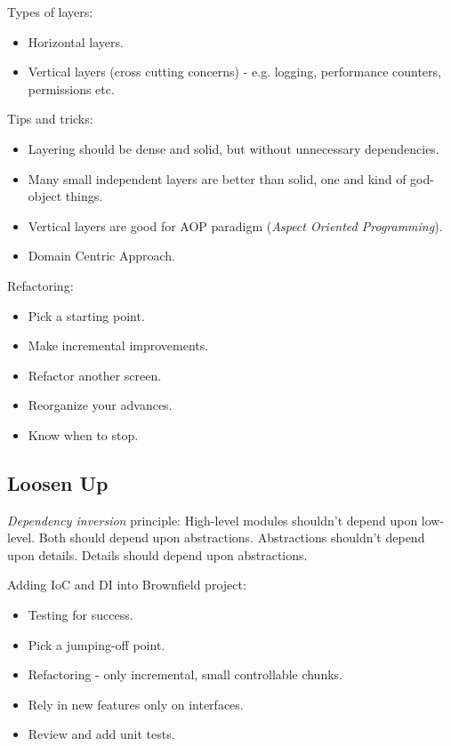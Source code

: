 \documentclass[11pt,a4paper]{article}
\begin{document}
Types of layers:
\begin{itemize}
	\item Horizontal layers.
	\item Vertical layers (cross cutting concerns) - e.g. logging, performance counters, permissions etc.
\end{itemize}

Tips and tricks:
\begin{itemize}
	\item Layering should be dense and solid, but without unnecessary dependencies.
	\item Many small independent layers are better than solid, one and kind of god-object things.
	\item Vertical layers are good for AOP paradigm (\textit{Aspect Oriented Programming}).
	\item Domain Centric Approach.
\end{itemize}

Refactoring:
\begin{itemize}
	\item Pick a starting point.
	\item Make incremental improvements.
	\item Refactor another screen.
	\item Reorganize your advances.
	\item Know when to stop.
\end{itemize}

\subsection{Loosen Up}

\textit{Dependency inversion} principle: High-level modules shouldn't depend upon low-level. Both should depend upon abstractions. Abstractions shouldn't depend upon details. Details should depend upon abstractions.

Adding IoC and DI into Brownfield project:
\begin{itemize}
	\item Testing for success.
	\item Pick a jumping-off point.
	\item Refactoring - only incremental, small controllable chunks.
	\item Rely in new features only on interfaces.
	\item Review and add unit tests.
\end{itemize}
\end{document}

